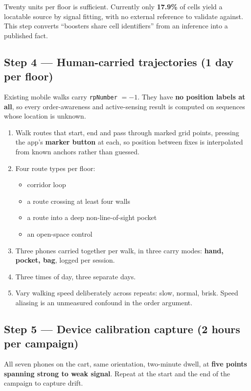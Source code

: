 \documentclass[11pt,a4paper]{article}
\newcommand{\B}[1]{\textcolor{bad}{\textbf{#1}}}
\begin{document}
Twenty units per floor is sufficient. Currently only \B{17.9\%} of cells yield a
locatable source by signal fitting, with no external reference to validate against. This
step converts ``boosters share cell identifiers'' from an inference into a published fact.

\subsection{Step 4 --- Human-carried trajectories (1 day per floor)}

Existing mobile walks carry \texttt{rpNumber} $=-1$. They have \B{no position labels at
all}, so every order-awareness and active-sensing result is computed on sequences whose
location is unknown.

\begin{enumerate}
\item Walk routes that start, end and pass through marked grid points, pressing the app's
\textbf{marker button} at each, so position between fixes is interpolated from known
anchors rather than guessed.
\item Four route types per floor:
\begin{itemize}
\item corridor loop
\item a route crossing at least four walls
\item a route into a deep non-line-of-sight pocket
\item an open-space control
\end{itemize}
\item Three phones carried together per walk, in three carry modes: \textbf{hand, pocket,
bag}, logged per session.
\item Three times of day, three separate days.
\item Vary walking speed deliberately across repeats: slow, normal, brisk. Speed aliasing
is an unmeasured confound in the order argument.
\end{enumerate}

\subsection{Step 5 --- Device calibration capture (2 hours per campaign)}

All seven phones on the cart, same orientation, two-minute dwell, at \textbf{five points
spanning strong to weak signal}. Repeat at the start and the end of the campaign to
capture drift.
\end{document}
